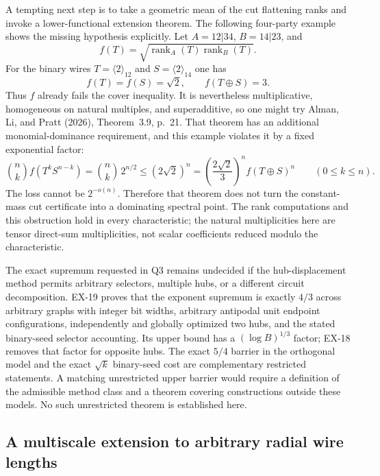 A tempting next step is to take a geometric mean of the cut flattening
ranks and invoke a lower-functional extension theorem. The following
four-party example shows the missing hypothesis explicitly. Let
$A=12|34$, $B=14|23$, and
\[
 f(T)=\sqrt{\operatorname{rank}_A(T)\operatorname{rank}_B(T)}.
\]
For the binary wires $T=\langle2\rangle_{12}$ and
$S=\langle2\rangle_{14}$ one has
\[
 f(T)=f(S)=\sqrt2,\qquad f(T\oplus S)=3.
\]
Thus $f$ already fails the cover inequality. It is nevertheless
multiplicative, homogeneous on natural multiples, and superadditive,
so one might try Alman, Li, and Pratt (2026), Theorem~3.9, p.~21.
That theorem has an additional monomial-dominance requirement, and
this example violates it by a fixed exponential factor:
\[
 \binom nk f(T^kS^{n-k})
 =\binom nk\,2^{n/2}
 \leq(2\sqrt2)^n
 =\left(\frac{2\sqrt2}{3}\right)^n f(T\oplus S)^n
 \qquad(0\leq k\leq n).
\]
The loss cannot be $2^{-o(n)}$. Therefore that theorem does not turn
the constant-mass cut certificate into a dominating spectral point.
The rank computations and this obstruction hold in every
characteristic; the natural multiplicities here are tensor direct-sum
multiplicities, not scalar coefficients reduced modulo the characteristic.

The exact supremum requested in Q3 remains undecided if the hub-displacement
method permits arbitrary selectors, multiple hubs, or a different circuit
decomposition. EX-19 proves that the exponent supremum is exactly $4/3$
across arbitrary graphs with integer bit widths, arbitrary antipodal unit
endpoint configurations, independently and globally optimized two hubs,
and the stated binary-seed selector accounting. Its upper bound has a
$(\log B)^{1/3}$ factor; EX-18 removes that factor for opposite hubs.
The exact $5/4$ barrier in the orthogonal model and the exact $\sqrt k$
binary-seed cost are complementary restricted statements. A matching
unrestricted upper barrier would require a definition of the admissible
method class and a theorem covering constructions outside these models.
No such unrestricted theorem is established here.

\subsection{A multiscale extension to arbitrary radial wire lengths}
\label{sec:ex-multiscale}

